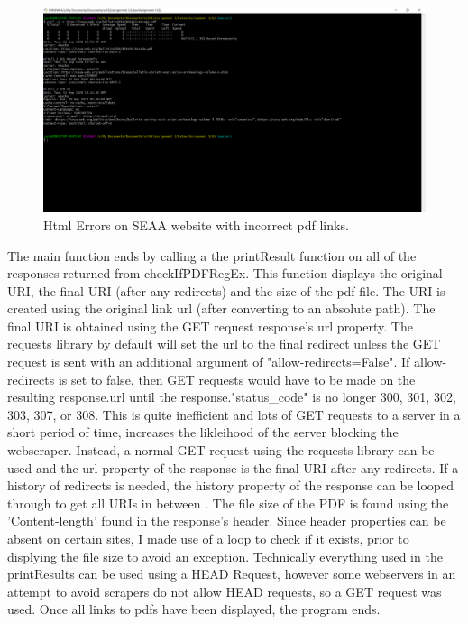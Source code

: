 \documentclass[12pt]{article}
\begin{document}
\begin{figure}[H]
    \centering
    \includegraphics[trim=0 60 10 20, clip, width=\textwidth] {Q3/seaaBadHTML_curl.png}
    \caption{Html Errors on SEAA website with incorrect pdf links. }
    \label{fig:q3SEAA_badHTML_curl}
\end{figure}


The main function ends by calling a the printResult function on all of the responses returned from checkIfPDFRegEx. This function displays the original URI, the final URI (after any redirects) and the size of the pdf file. The URI is created using the original link url (after converting to an absolute path). The final URI is obtained using the GET request response's url property. The requests library by default will set the url to the final redirect unless the GET request is sent with an additional argument of "allow-redirects=False". If allow-redirects is set to false, then GET requests would have to be made on the resulting response.url until the response."status\_code" is no longer 300, 301, 302, 303, 307, or 308. This is quite inefficient and lots of GET requests to a server in a short period of time, increases the likleihood of the server blocking the webscraper. Instead, a normal GET request using the requests library can be used and the url property of the response is the final URI after any redirects. If a history of redirects is needed, the history property of the response can be looped through to get all URIs in between \cite{stackOverflowRedirects}. The file size of the PDF is found using the 'Content-length'  found in the response's header.  Since header properties can be absent on certain sites, I made use of a loop to check if it exists, prior to displying the file size to avoid an exception. Technically everything used in the printResults  can be used using a HEAD Request, however some webservers in an attempt to avoid scrapers do not allow HEAD requests, so a GET request was used. Once all links to pdfs have been displayed, the program ends. 
\end{document}

